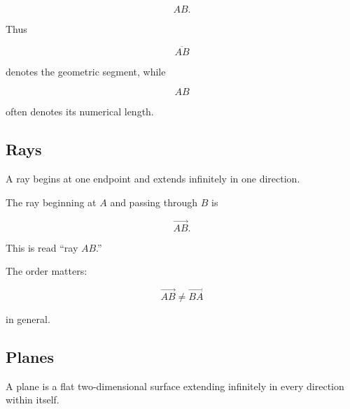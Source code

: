 \[ AB. \]

Thus

\[
\overline{AB}
\]

denotes the geometric segment, while

\[
AB
\]

often denotes its numerical length.

\begin{centereddiagram}
\end{centereddiagram}

\subsection{Rays}
\label{subsec:euclidean-rays}

A ray begins at one endpoint and extends infinitely in one direction.

The ray beginning at \(A\) and passing through \(B\) is

\[ \overrightarrow{AB}. \]

This is read ``ray \(AB\).''

The order matters:

\[ \overrightarrow{AB}\neq\overrightarrow{BA} \]

in general.

\begin{centereddiagram}
\end{centereddiagram}

\subsection{Planes}
\label{subsec:euclidean-planes}

A plane is a flat two-dimensional surface extending infinitely in every
direction within itself.

